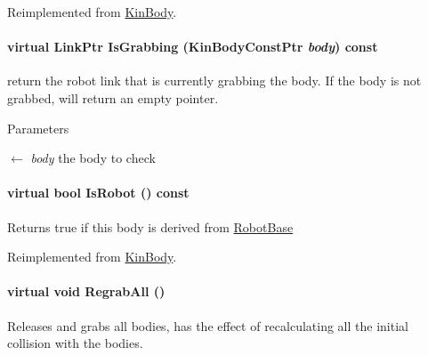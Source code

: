 Reimplemented from \hyperlink{classOpenRAVE_1_1KinBody_ae67a1ee5e11749340bfbca5bd6749424}{KinBody}.

\hypertarget{classOpenRAVE_1_1RobotBase_a10ff30e0c1c04abfcbf5ce480a82330f}{
\paragraph[{IsGrabbing}]{\setlength{\rightskip}{0pt plus 5cm}virtual LinkPtr IsGrabbing (KinBodyConstPtr {\em body}) const}\hfill}
\label{classOpenRAVE_1_1RobotBase_a10ff30e0c1c04abfcbf5ce480a82330f}


return the robot link that is currently grabbing the body. If the body is not grabbed, will return an empty pointer. 


\begin{DoxyParams}{Parameters}
\item[\mbox{$\leftarrow$} {\em body}]the body to check \end{DoxyParams}
\hypertarget{classOpenRAVE_1_1RobotBase_a38fa8d57d2eefc36568411a129c741d3}{
\paragraph[{IsRobot}]{\setlength{\rightskip}{0pt plus 5cm}virtual bool IsRobot () const}\hfill}
\label{classOpenRAVE_1_1RobotBase_a38fa8d57d2eefc36568411a129c741d3}
\begin{DoxyReturn}{Returns}
true if this body is derived from \hyperlink{classOpenRAVE_1_1RobotBase}{RobotBase} 
\end{DoxyReturn}


Reimplemented from \hyperlink{classOpenRAVE_1_1KinBody_a38fa8d57d2eefc36568411a129c741d3}{KinBody}.

\hypertarget{classOpenRAVE_1_1RobotBase_ac96a4eead413884c18f29cbf299ede3a}{
\paragraph[{RegrabAll}]{\setlength{\rightskip}{0pt plus 5cm}virtual void RegrabAll ()}\hfill}
\label{classOpenRAVE_1_1RobotBase_ac96a4eead413884c18f29cbf299ede3a}
Releases and grabs all bodies, has the effect of recalculating all the initial collision with the bodies.


